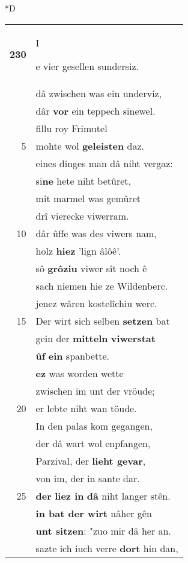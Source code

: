 \documentclass[8pt,a4paper,notitlepage]{article}
\begin{document}
\begin{table}[ht]
\begin{minipage}[t]{0.5\linewidth}
\small
\begin{center}*D
\end{center}
\begin{tabular}{rl}
\textbf{230} & \begin{large}I\end{large}e vier gesellen sundersiz.\\ 
 & dâ zwischen was ein underviz,\\ 
 & dâr \textbf{vor} ein teppech sinewel.\\ 
 & fillu roy Frimutel\\ 
5 & mohte wol \textbf{geleisten} daz.\\ 
 & eines dinges man dâ niht vergaz:\\ 
 & si\textbf{ne} hete niht betûret,\\ 
 & mit marmel was gemûret\\ 
 & drî vierecke viwerram.\\ 
10 & dâr ûffe was des viwers nam,\\ 
 & holz \textbf{hiez} 'lign âlôê'.\\ 
 & sô \textbf{grôziu} viwer sît noch ê\\ 
 & sach niemen hie ze Wildenberc.\\ 
 & jenez wâren kostelîchiu werc.\\ 
15 & Der wirt sich selben \textbf{setzen} bat\\ 
 & gein der \textbf{mitteln} \textbf{viwerstat}\\ 
 & \textbf{ûf} \textbf{ein} spanbette.\\ 
 & \textbf{ez} was worden wette\\ 
 & zwischen im unt der vröude;\\ 
20 & er lebte niht wan töude.\\ 
 & In den palas kom gegangen,\\ 
 & der dâ wart wol enpfangen,\\ 
 & Parzival, der \textbf{lieht gevar},\\ 
 & von im, der in sante dar.\\ 
25 & \textbf{der} \textbf{liez in} \textbf{dâ} niht langer stên.\\ 
 & \textbf{in bat der wirt} nâher gên\\ 
 & \textbf{unt sitzen}: "zuo mir dâ her an.\\ 
 & sazte ich iuch verre \textbf{dort} hin dan,\\ 

\end{tabular}
\end{minipage}
\end{table}
\end{document}
